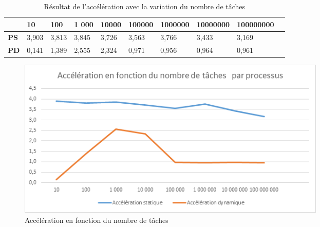 \documentclass[a4paper,12pt]{article}
\begin{document}
\begin{table}[H]
\caption{Résultat de l'accélération avec la variation du nombre de tâches}
\label{tab:acc3}
\begin{tabular}{|l|l|l|l|l|l|l|l|l|l|}
\hline
            & \textbf{10} & \textbf{100} & \textbf{1 000} & \textbf{10000} & \textbf{100000} & \textbf{1000000} & \textbf{10000000} & \textbf{100000000} \\ \hline
\textbf{PS} & 3,903       & 3,813        & 3,845          & 3,726          & 3,563           & 3,766            & 3,433             & 3,169              \\ \hline
\textbf{PD} & 0,141       & 1,389        & 2,555          & 2,324          & 0,971           & 0,956 			& 0,964             & 0,961            	 \\ \hline

\end{tabular}
\end{table}

\begin{figure}[H]
\center \includegraphics[width=15cm]{acc3} %
\caption{Accélération en fonction du nombre de tâches}
\label{fig:acc3}
\end{figure}

\newpage
\end{document}
